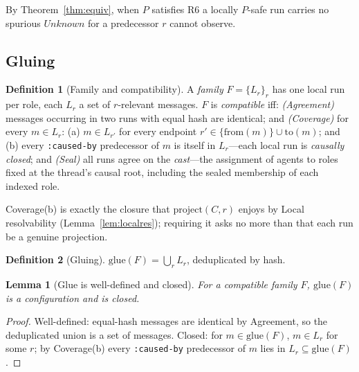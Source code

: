 \documentclass[11pt]{article}
\newcommand{\code}[1]{\texttt{#1}}
\newcommand{\caused}{\code{:caused-by}}
\theoremstyle{definition}
\newtheorem{definition}{Definition}
\theoremstyle{plain}
\newtheorem{lemma}{Lemma}
\begin{document}
By Theorem~\ref{thm:equiv}, when $P$ satisfies R6 a locally $P$-safe run carries no
spurious $\mathit{Unknown}$ for a predecessor $r$ cannot observe.

\subsection{Gluing}

\begin{definition}[Family and compatibility]
\label{def:compatible}
A \emph{family} $F=\{L_r\}_{r}$ has one local run per role, each $L_r$ a set of
$r$-relevant messages.
$F$ is \emph{compatible} iff:
\emph{(Agreement)} messages occurring in two runs with equal hash are identical; and
\emph{(Coverage)} for every $m\in L_r$:
\textup{(a)} $m\in L_{r'}$ for every endpoint $r'\in\{\mathrm{from}(m)\}\cup\mathrm{to}(m)$;
and
\textup{(b)} every \caused{} predecessor of $m$ is itself in $L_r$---each local run is
\emph{causally closed};
and \emph{(Seal)} all runs agree on the \emph{cast}---the assignment of agents to roles
fixed at the thread's causal root, including the sealed membership of each indexed role.
\end{definition}

\noindent
Coverage(b) is exactly the closure that $\mathrm{project}(C,r)$ enjoys by Local
resolvability (Lemma~\ref{lem:localres}); requiring it asks no more than that each run be a
genuine projection.

\begin{definition}[Gluing]
\label{def:glue}
$\mathrm{glue}(F)=\bigcup_r L_r$, deduplicated by hash.
\end{definition}

\begin{lemma}[Glue is well-defined and closed]
\label{lem:glue-closed}
For a compatible family $F$, $\mathrm{glue}(F)$ is a configuration and is closed.
\end{lemma}
\begin{proof}
Well-defined: equal-hash messages are identical by Agreement, so the deduplicated union
is a set of messages.
Closed: for $m\in\mathrm{glue}(F)$, $m\in L_r$ for some $r$; by Coverage(b) every
\caused{} predecessor of $m$ lies in $L_r\subseteq\mathrm{glue}(F)$.
\end{proof}
\end{document}
